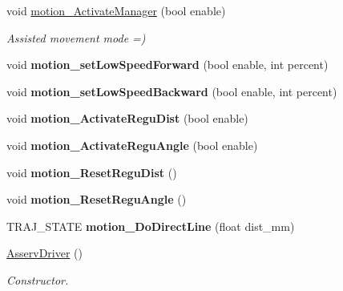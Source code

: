 \begin{DoxyCompactItemize}
\mbox{\label{classAsservDriver_aaeb3c80c8a079c812af38273f825c537}} 
void \hyperlink{classAsservDriver_aaeb3c80c8a079c812af38273f825c537}{motion\+\_\+\+Activate\+Manager} (bool enable)
\begin{DoxyCompactList}\small\item\em Assisted movement mode =) \end{DoxyCompactList}\item 
\mbox{\label{classAsservDriver_a17a6651fc8ecebafc085c46af984b099}} 
void {\bfseries motion\+\_\+set\+Low\+Speed\+Forward} (bool enable, int percent)
\item 
\mbox{\label{classAsservDriver_ac01272d7ef32443b3c283186041324c3}} 
void {\bfseries motion\+\_\+set\+Low\+Speed\+Backward} (bool enable, int percent)
\item 
\mbox{\label{classAsservDriver_a48e4f69bf857d6a18098dc48615a61f1}} 
void {\bfseries motion\+\_\+\+Activate\+Regu\+Dist} (bool enable)
\item 
\mbox{\label{classAsservDriver_a846608b8033f7d592d2540b68de72eeb}} 
void {\bfseries motion\+\_\+\+Activate\+Regu\+Angle} (bool enable)
\item 
\mbox{\label{classAsservDriver_acb84d282c7e0b40d9b326b0fcb7a0c69}} 
void {\bfseries motion\+\_\+\+Reset\+Regu\+Dist} ()
\item 
\mbox{\label{classAsservDriver_acd102376cacdf0fc40a587f25359a25e}} 
void {\bfseries motion\+\_\+\+Reset\+Regu\+Angle} ()
\item 
\mbox{\label{classAsservDriver_a9d967bff5061c791226484bbd998362b}} 
T\+R\+A\+J\+\_\+\+S\+T\+A\+TE {\bfseries motion\+\_\+\+Do\+Direct\+Line} (float dist\+\_\+mm)
\item 
\mbox{\label{classAsservDriver_a70982198e21af96e5d4faa6ce9b0608c}} 
\hyperlink{classAsservDriver_a70982198e21af96e5d4faa6ce9b0608c}{Asserv\+Driver} ()
\begin{DoxyCompactList}\small\item\em Constructor. \end{DoxyCompactList}\item 

\end{DoxyCompactItemize}
